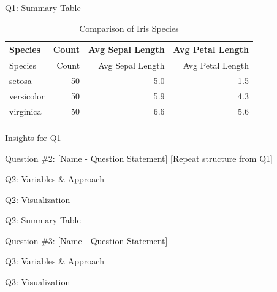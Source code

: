 \documentclass[
  ignorenonframetext,
  aspectratio=169,
]{beamer}
\begin{document}
\begin{frame}{Q1: Summary Table}
\protect{}\label{q1-summary-table}
\begin{longtable}[]{@{}lrrr@{}}
\caption{Comparison of Iris Species}\tabularnewline
\toprule\noalign{}
Species & Count & Avg Sepal Length & Avg Petal Length \\
\midrule\noalign{}
\endfirsthead
\toprule\noalign{}
Species & Count & Avg Sepal Length & Avg Petal Length \\
\midrule\noalign{}
\endhead
setosa & 50 & 5.0 & 1.5 \\
versicolor & 50 & 5.9 & 4.3 \\
virginica & 50 & 6.6 & 5.6 \\
\bottomrule\noalign{}
\end{longtable}

Insights for Q1
\end{frame}

\begin{frame}{Question \#2: {[}Name - Question Statement{]}}
\protect{}\label{question-2-name---question-statement}
{[}Repeat structure from Q1{]}
\end{frame}

\begin{frame}{Q2: Variables \& Approach}
\protect{}\label{q2-variables-approach}
\end{frame}

\begin{frame}{Q2: Visualization}
\protect{}\label{q2-visualization}
\end{frame}

\begin{frame}{Q2: Summary Table}
\protect{}\label{q2-summary-table}
\end{frame}

\begin{frame}{Question \#3: {[}Name - Question Statement{]}}
\protect{}\label{question-3-name---question-statement}
\end{frame}

\begin{frame}{Q3: Variables \& Approach}
\protect{}\label{q3-variables-approach}
\end{frame}

\begin{frame}{Q3: Visualization}
\protect{}\label{q3-visualization}
\end{frame}
\end{document}
